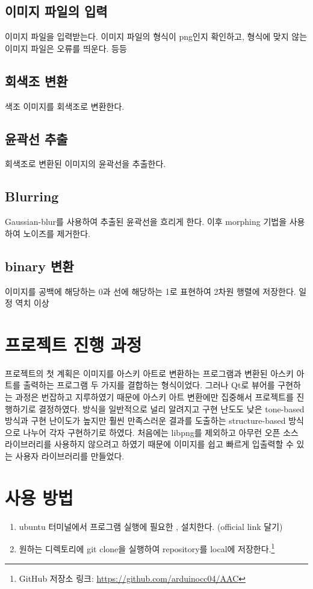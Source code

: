 \documentclass[conference]{IEEEtran}
\begin{document}
\subsection{이미지 파일의 입력}

이미지 파일을 입력받는다. 이미지 파일의 형식이 png인지 확인하고, 형식에 맞지 않는 이미지 파일은 오류를 띄운다. 등등

\subsection{회색조 변환}

색조 이미지를 회색조로 변환한다.

\subsection{윤곽선 추출}

회색조로 변환된 이미지의 윤곽선을 추출한다.

\subsection{Blurring}

Gaussian-blur를 사용하여 추출된 윤곽선을 흐리게 한다. 이후 morphing 기법을 사용하여 노이즈를 제거한다.

\subsection{binary 변환}

이미지를 공백에 해당하는 0과 선에 해당하는 1로 표현하여 2차원 행렬에 저장한다.
일정 역치 이상 

\section{프로젝트 진행 과정}

프로젝트의 첫 계획은 이미지를 아스키 아트로 변환하는 프로그램과 변환된 아스키 아트를 출력하는 프로그램 두 가지를 결합하는 형식이었다.
그러나 Qt로 뷰어를 구현하는 과정은 번잡하고 지루하였기 때문에 아스키 아트 변환에만 집중해서 프로젝트를 진행하기로 결정하였다.
방식을 일반적으로 널리 알려지고 구현 난도도 낮은 tone-based 방식과 구현 난이도가 높지만 훨씬 만족스러운 결과를 도출하는 structure-based 방식으로 나누어 각자 구현하기로 하였다.
처음에는 libpng를 제외하고 아무런 오픈 소스 라이브러리를 사용하지 않으려고 하였기 때문에 이미지를 쉽고 빠르게 입출력할 수 있는 사용자 라이브러리를 만들었다.


\section{사용 방법}
\begin{enumerate}
\item ubuntu 터미널에서 프로그램 실행에 필요한 \libpng,  설치한다.
(official link 달기)
\item 원하는 디렉토리에 git clone을 실행하여 repository를 local에 저장한다.\footnote{GitHub 저장소 링크: \href{https://github.com/arduinocc04/AAC}{https://github.com/arduinocc04/AAC}} 
\end{enumerate}
\end{document}
